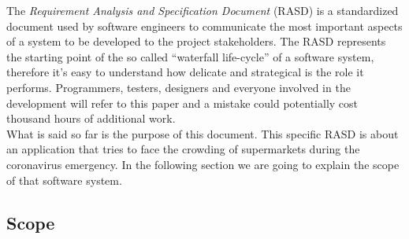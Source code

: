\documentclass[]{article}
\begin{document}
	The \textit{Requirement Analysis and Specification Document} (RASD) is a standardized document used by software engineers to communicate the most important aspects of a system to be developed to the project stakeholders. The RASD represents the starting point of the so called “waterfall life-cycle” of a software system, therefore it’s easy to understand how delicate and strategical is the role it performs. Programmers, testers, designers and everyone involved in the development will refer to this paper and a mistake could potentially cost thousand hours of additional work. 
	\smallskip
	\\
	What is said so far is the purpose of this document. This specific RASD is about an application that tries to face the crowding of supermarkets during the coronavirus emergency. In the following section we are going to explain the scope of that software system.

	\subsection{Scope}
	
		
				
\end{document}
